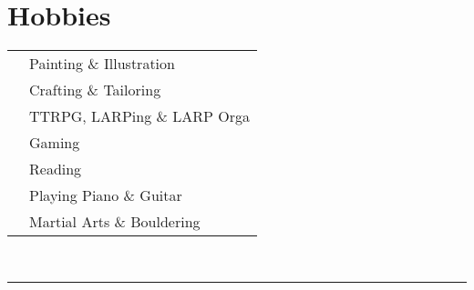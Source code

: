 \documentclass[oneside]{article}
\begin{document}
{\begin{minipage}[t][\dimexpr\textheight-2\fboxrule-2\fboxsep\relax][t]{\dimexpr0.4\textwidth-2\fboxrule-2\fboxsep\relax}
        \section*{\large Hobbies}
        \begin{tabularx}{\textwidth}{cY}
            \faPaintBrush{} & Painting \& Illustration \\
            \faPencilRuler{} & Crafting \& Tailoring \\
            \faStar{} & TTRPG, LARPing \& LARP Orga \\
            \faGamepad{} & Gaming \\
            \faBook{} & Reading \\
            \faGuitar{} & Playing Piano \& Guitar \\
            \faRunning{} & Martial Arts \& Bouldering \\
        \end{tabularx}
        \vspace{.3cm}
        \\
        \rule{\linewidth}{0.4pt}
    \end{minipage}%
}%
\end{document}
